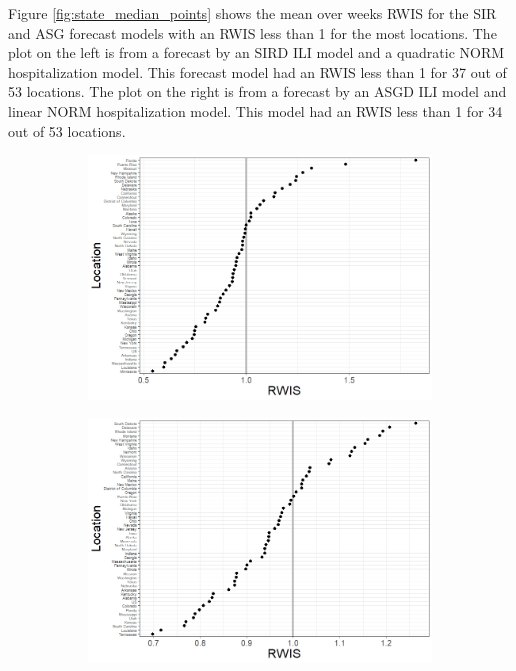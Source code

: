\documentclass{article}
\begin{document}
Figure \ref{fig:state_median_points} shows the mean over weeks RWIS for the SIR and ASG forecast models with an RWIS less than 1 for the most locations. The plot on the left is from a forecast by an SIRD ILI model and a quadratic NORM hospitalization model. This forecast model had an RWIS less than 1 for 37 out of 53 locations. The plot on the right is from a forecast by an ASGD ILI model and linear NORM hospitalization model. This model had an RWIS less than 1 for 34 out of 53 locations.

\begin{figure}
\centering
\begin{subfigure}{.5\textwidth}
  \centering
  \includegraphics[width=1\linewidth]{../../Images/sir_disc_hosp_sq_ar1_rwis.png}
\end{subfigure}%
\begin{subfigure}{.5\textwidth}
  \centering
  \includegraphics[width=1\linewidth]{../../Images/asg_disc_hosp_ar1_rwis.png}

\end{subfigure}
\end{figure}
\end{document}
